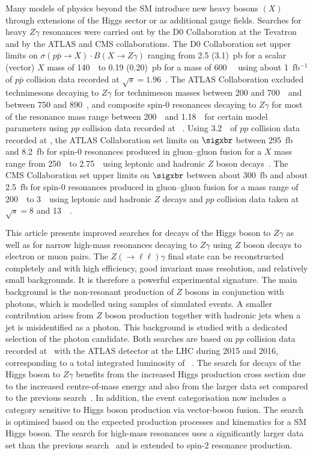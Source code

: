 Many models of physics beyond the SM introduce new heavy bosons $(X)$ through extensions of the Higgs
sector or as additional gauge fields. 
Searches for heavy $Z\gamma$ resonances were carried out by the D0 Collaboration at the 
Tevatron and by the ATLAS and CMS collaborations. 
The D0 Collaboration set upper limits on $\sigma(p\bar{p}\to X) \cdot B(X\to Z\gamma)$ ranging from 
2.5 (3.1)~pb  for a scalar (vector) $X$ mass of 140~\GeV\ to 0.19 (0.20)~pb for a mass of 
600~\GeV~\cite{d0-highmass-2}
using about 1~fb$^{-1}$ of $p\bar{p}$ collision data recorded
at $\sqrt{s} = 1.96$~\TeV.
The ATLAS Collaboration excluded technimesons decaying to $Z\gamma$ for
technimeson masses between 200 and 700~\GeV\ and between 750 and 890~\GeV, and composite spin-0
resonances decaying to $Z\gamma$
for most of the resonance mass range between 
200~\GeV\ and 1.18~\TeV\ for certain model parameters using $pp$ collision data recorded at
\sqes~\cite{atlas-highmass2}. Using 3.2~\invfb\ of $pp$ collision data recorded at \sqtt, the
ATLAS Collaboration set limits on $\sigxbr$ between 295~fb and 8.2~fb
for spin-0 resonances produced in gluon--gluon fusion for a $X$ mass range from 250~\GeV\ to 
2.75~\TeV\ using leptonic and hadronic $Z$ boson decays~\cite{Aaboud:2016trl}. 
The CMS Collaboration set upper limits on $\sigxbr$ between about 300~fb
and about 2.5~fb for spin-0 resonances produced in gluon--gluon fusion for a mass range of 200~\GeV\ to
3~\TeV\ using leptonic and hadronic $Z$ decays and $pp$ collision data taken at $\sqrt{s}=8$ and 
13~\TeV~\cite{cms-highmass2}.

This article presents improved searches for decays of the Higgs boson to $Z\gamma$ as well as 
for narrow high-mass resonances decaying to $Z\gamma$
using $Z$ boson decays to electron or muon pairs. 
The $Z(\to\ell\ell)\gamma$ final state can be reconstructed completely and with high
efficiency, good invariant mass resolution, and relatively small backgrounds. 
It is therefore a powerful experimental signature.
The main background is the non-resonant production of $Z$ bosons in 
conjunction with
photons, which is modelled using samples of simulated events. A smaller contribution 
arises from $Z$ boson production together with hadronic jets when a jet is misidentified
as a photon. This background is studied with a dedicated selection of the photon candidate.  
Both searches are based on $pp$ collision data recorded at
\sqtt~with the ATLAS detector at the LHC during 2015 and 2016, corresponding to a total
integrated luminosity of \lumithirteentev~\invfb.
The search for decays of the Higgs boson to $Z\gamma$ benefits from the increased
Higgs production cross section due to the increased centre-of-mass energy and also from the
larger data set compared to the previous search~\cite{atlas-lowmass}. In addition, the
event categorisation now includes a category sensitive to Higgs boson production 
via vector-boson fusion. The search is optimised based on the expected production
processes and kinematics for a SM Higgs boson.
The search for high-mass resonances uses a 
significantly larger data set than the previous search~\cite{Aaboud:2016trl}
and is extended to spin-2 resonance production.
 
